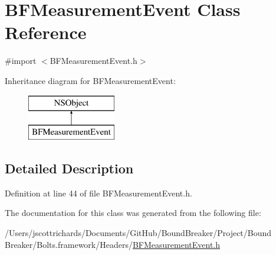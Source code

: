 \hypertarget{interface_b_f_measurement_event}{}\section{B\+F\+Measurement\+Event Class Reference}
\label{interface_b_f_measurement_event}


{\ttfamily \#import $<$B\+F\+Measurement\+Event.\+h$>$}

Inheritance diagram for B\+F\+Measurement\+Event\+:\begin{figure}[H]
\begin{center}
\leavevmode
\includegraphics[height=2.000000cm]{interface_b_f_measurement_event}
\end{center}
\end{figure}


\subsection{Detailed Description}


Definition at line 44 of file B\+F\+Measurement\+Event.\+h.



The documentation for this class was generated from the following file\+:\begin{DoxyCompactItemize}
\item 
/\+Users/jscottrichards/\+Documents/\+Git\+Hub/\+Bound\+Breaker/\+Project/\+Bound Breaker/\+Bolts.\+framework/\+Headers/\hyperlink{_b_f_measurement_event_8h}{B\+F\+Measurement\+Event.\+h}\end{DoxyCompactItemize}
